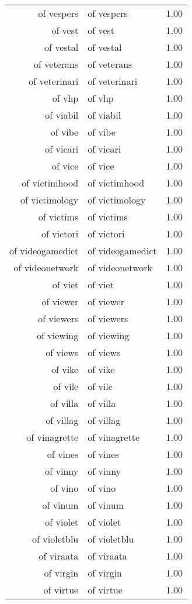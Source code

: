 \begin{table}[ht]
\begin{tabular}{rlr}
  of vespers & of vespers & 1.00 \\ 
  of vest & of vest & 1.00 \\ 
  of vestal & of vestal & 1.00 \\ 
  of veterans & of veterans & 1.00 \\ 
  of veterinari & of veterinari & 1.00 \\ 
  of vhp & of vhp & 1.00 \\ 
  of viabil & of viabil & 1.00 \\ 
  of vibe & of vibe & 1.00 \\ 
  of vicari & of vicari & 1.00 \\ 
  of vice & of vice & 1.00 \\ 
  of victimhood & of victimhood & 1.00 \\ 
  of victimology & of victimology & 1.00 \\ 
  of victims & of victims & 1.00 \\ 
  of victori & of victori & 1.00 \\ 
  of videogamedict & of videogamedict & 1.00 \\ 
  of videonetwork & of videonetwork & 1.00 \\ 
  of viet & of viet & 1.00 \\ 
  of viewer & of viewer & 1.00 \\ 
  of viewers & of viewers & 1.00 \\ 
  of viewing & of viewing & 1.00 \\ 
  of views & of views & 1.00 \\ 
  of vike & of vike & 1.00 \\ 
  of vile & of vile & 1.00 \\ 
  of villa & of villa & 1.00 \\ 
  of villag & of villag & 1.00 \\ 
  of vinagrette & of vinagrette & 1.00 \\ 
  of vines & of vines & 1.00 \\ 
  of vinny & of vinny & 1.00 \\ 
  of vino & of vino & 1.00 \\ 
  of vinum & of vinum & 1.00 \\ 
  of violet & of violet & 1.00 \\ 
  of violetblu & of violetblu & 1.00 \\ 
  of viraata & of viraata & 1.00 \\ 
  of virgin & of virgin & 1.00 \\ 
  of virtue & of virtue & 1.00 \\ 

\end{tabular}
\end{table}
